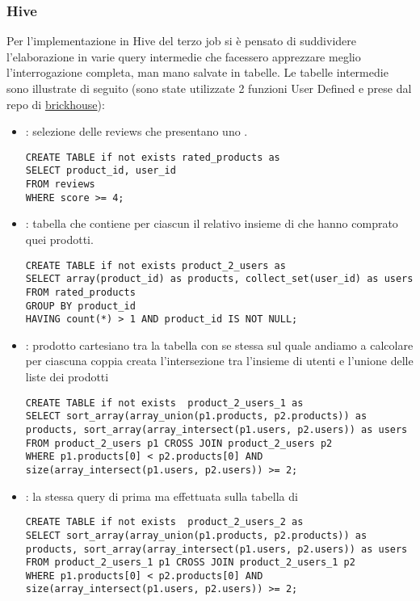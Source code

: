 \newpage
  \subsubsection{Hive}
    Per l'implementazione in Hive del terzo job si è pensato di suddividere l’elaborazione in varie query intermedie che facessero apprezzare meglio l’interrogazione completa, man mano salvate in tabelle. Le tabelle intermedie sono illustrate di seguito (sono state utilizzate 2 funzioni User Defined  e  prese dal repo di \href{https://github.com/klout/brickhouse/tree/8fce0ac98aef422772ac89de7a620caac47ccc9d}{brickhouse}):
\begin{itemize}
    \item {}: selezione delle reviews che presentano uno .
    \begin{lstlisting}[style=all, style=SQLStyle]
CREATE TABLE if not exists rated_products as
SELECT product_id, user_id
FROM reviews
WHERE score >= 4;
\end{lstlisting}
    \item {}: tabella che contiene per ciascun  il relativo insieme di  che hanno comprato quei prodotti.
    \begin{lstlisting}[style=all, style=SQLStyle]
CREATE TABLE if not exists product_2_users as
SELECT array(product_id) as products, collect_set(user_id) as users
FROM rated_products
GROUP BY product_id
HAVING count(*) > 1 AND product_id IS NOT NULL;
\end{lstlisting}
    \item {}: prodotto cartesiano tra la tabella  con se stessa sul quale andiamo a calcolare per ciascuna coppia creata l'intersezione tra l'insieme di utenti e l’unione delle liste dei prodotti
\begin{lstlisting}[style=all, style=SQLStyle]
CREATE TABLE if not exists  product_2_users_1 as
SELECT sort_array(array_union(p1.products, p2.products)) as products, sort_array(array_intersect(p1.users, p2.users)) as users
FROM product_2_users p1 CROSS JOIN product_2_users p2
WHERE p1.products[0] < p2.products[0] AND size(array_intersect(p1.users, p2.users)) >= 2;
\end{lstlisting}
    \item {}: la stessa query di prima ma effettuata sulla tabella di 
\begin{lstlisting}[style=all, style=SQLStyle]
CREATE TABLE if not exists  product_2_users_2 as
SELECT sort_array(array_union(p1.products, p2.products)) as products, sort_array(array_intersect(p1.users, p2.users)) as users
FROM product_2_users_1 p1 CROSS JOIN product_2_users_1 p2
WHERE p1.products[0] < p2.products[0] AND size(array_intersect(p1.users, p2.users)) >= 2;
\end{lstlisting}


\end{itemize}
